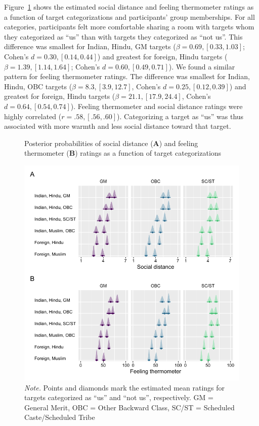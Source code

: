 \documentclass[12pt, a4paper]{article}
\begin{document}
Figure~\ref{fig:f5} shows the estimated social distance and feeling thermometer ratings as a function of target categorizations and participants’ group memberships. For all categories, participants felt more comfortable sharing a room with targets whom they categorized as “us” than with targets they categorized as “not us”. This difference was smallest for Indian, Hindu, GM targets ($\beta = 0.69, [0.33, 1.03]$; Cohen’s $d = 0.30, [0.14, 0.44]$) and greatest for foreign, Hindu targets ($\beta = 1.39, [1.14, 1.64]$; Cohen’s $d = 0.60, [0.49, 0.71]$). We found a similar pattern for feeling thermometer ratings. The difference was smallest for Indian, Hindu, OBC targets ($\beta = 8.3, [3.9, 12.7]$, Cohen’s $d = 0.25, [0.12, 0.39]$) and greatest for foreign, Hindu targets ($\beta = 21.1, [17.9, 24.4]$, Cohen’s $d = 0.64, [0.54, 0.74]$). Feeling thermometer and social distance ratings were highly correlated ($r = .58, [.56, .60]$). Categorizing a target as “us” was thus associated with more warmth and less social distance toward that target.

\begin{figure}
\caption{Posterior probabilities of social distance (\textbf{A}) and feeling thermometer (\textbf{B}) ratings as a function of target categorizations}
\centering
\includegraphics[scale=1]{../figures/figure-5}
\caption*{\textit{Note.} Points and diamonds mark the estimated mean ratings for targets categorized as “us” and “not us”, respectively. GM = General Merit, OBC = Other Backward Class, SC/ST = Scheduled Caste/Scheduled Tribe}
\label{fig:f5}
\end{figure}
\end{document}
